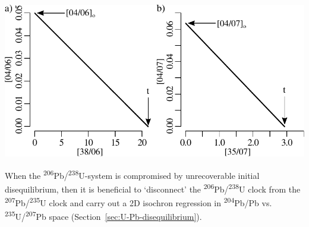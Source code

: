 \begin{refsection}
\begin{enumerate}
  \noindent\begin{minipage}[t]{.6\linewidth}
  \strut\vspace*{-\baselineskip}\newline
  \includegraphics[width=\textwidth]{../figures/UPbisochron46.pdf}
  \end{minipage}
  \begin{minipage}[t]{.4\linewidth}
    \label{fig:UPbisochron46}
  \end{minipage}

  When the \textsuperscript{206}Pb/\textsuperscript{238}U-system is
  compromised by unrecoverable initial disequilibrium, then it is
  beneficial to `disconnect' the
  \textsuperscript{206}Pb/\textsuperscript{238}U clock from the
  \textsuperscript{207}Pb/\textsuperscript{235}U clock and carry out a
  2D isochron regression in
  \textsuperscript{204}Pb/Pb
  vs. \textsuperscript{235}U/\textsuperscript{207}Pb space
  (Section~\ref{sec:U-Pb-disequilibrium}).


\end{enumerate}
\end{refsection}
